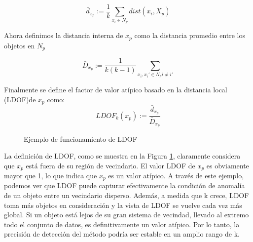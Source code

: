 \[ \bar{d}_{x_p}  := \frac{1}{k} \sum_{x_i \in N_p} dist(x_i,X_p)\]

Ahora definimos la distancia interna de $x_p$ como la distancia promedio 
entre los objetos en $N_p$

\[     \bar{D}_{x_p}  := \frac{1}{k(k-1)}  \sum_{x_i,x_i'  \in  N_p i \neq i' }   \]


Finalmente se define el factor de valor atípico basado en la distancia local 
(LDOF)de $x_p$ como:
\[    LDOF_k(x_p) := \frac{\bar{d}_{x_p}}{\bar{D}_{x_p}}       \]

\begin{figure}[h]
    \caption{\label{fig:LDOF} Ejemplo de funcionamiento de LDOF}
\end{figure}

La definición de LDOF, como se muestra en la Figura \ref{fig:LDOF}, 
claramente considera que $x_p$ está fuera de su región de vecindario. 
El valor LDOF de $x_p$ es obviamente mayor que 1, lo que indica que $x_p$
es un valor atípico. A través de este ejemplo, podemos ver que LDOF 
puede capturar efectivamente la condición de anomalía de un objeto 
entre un vecindario disperso. Además, a medida que k crece, LDOF 
toma más objetos en consideración y la vista de LDOF se vuelve cada 
vez más global. Si un objeto está lejos de su gran sistema de vecindad, llevado al 
extremo todo el conjunto de datos, es definitivamente un valor 
atípico. Por lo tanto, la precisión de detección del método podría ser
estable en un amplio rango de k.

